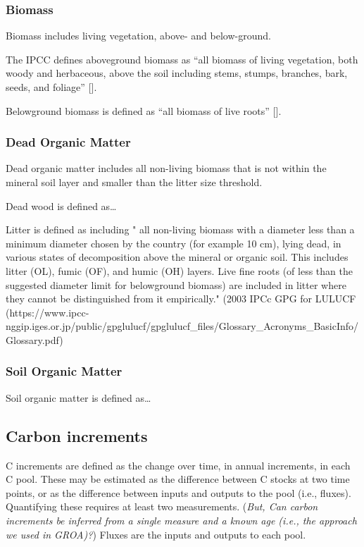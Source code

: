\documentclass[, manuscript]{copernicus}
\begin{document}
\subsubsection{Biomass}

Biomass includes living vegetation, above- and below-ground.

The IPCC defines aboveground biomass as ``all biomass of living
vegetation, both woody and herbaceous, above the soil including stems,
stumps, branches, bark, seeds, and foliage'' {[}{]}.

Belowground biomass is defined as ``all biomass of live roots'' {[}{]}.

\subsubsection{Dead Organic Matter}

Dead organic matter includes all non-living biomass that is not within
the mineral soil layer and smaller than the litter size threshold.

Dead wood is defined as\ldots{}

Litter is defined as including " all non-living biomass with a diameter
less than a minimum diameter chosen by the country (for example 10 cm),
lying dead, in various states of decomposition above the mineral or
organic soil. This includes litter (OL), fumic (OF), and humic (OH)
layers. Live fine roots (of less than the suggested diameter limit for
belowground biomass) are included in litter where they cannot be
distinguished from it empirically." (2003 IPCc GPG for LULUCF
(https://www.ipcc-nggip.iges.or.jp/public/gpglulucf/gpglulucf\_files/Glossary\_Acronyms\_BasicInfo/Glossary.pdf)

\subsubsection{Soil Organic Matter}

Soil organic matter is defined as\ldots{}

\subsection{Carbon increments}

C increments are defined as the change over time, in annual increments,
in each C pool. These may be estimated as the difference between C
stocks at two time points, or as the difference between inputs and
outputs to the pool (i.e., fluxes). Quantifying these requires at least
two measurements. (\emph{But, Can carbon increments be inferred from a
single measure and a known age (i.e., the approach we used in GROA)?})
Fluxes are the inputs and outputs to each pool.
\end{document}
